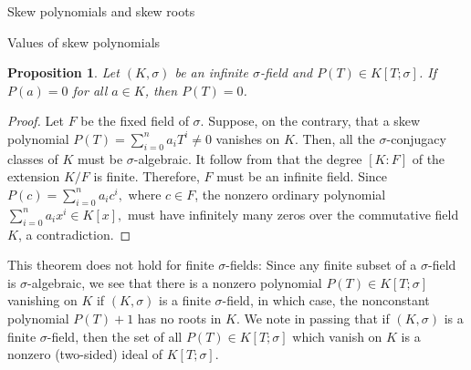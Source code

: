 \documentclass[11pt,a4paper]{article}
\theoremstyle{theorem}
\newtheorem{proposition}[theorem]{Proposition}
\numberwithin{equation}{section}
\newcommand{\s}{\sigma}
\begin{document}
\begin{section}{Skew polynomials and skew roots}
\begin{subsection}{Values of skew polynomials}
	\begin{proposition}
		Let $(K,\sigma)$ be an infinite $\s$-field and  $P(T)\in K[T;\sigma]$. If $P(a)=0$ for all $a\in K$, then $P(T)=0$. 
	\end{proposition}
	\begin{proof}
		Let $F$ be the fixed field of $\s$. Suppose, on the contrary, that a skew polynomial $P(T)=\sum_{i=0}^n a_i T^i\neq 0$ vanishes on $K$.  Then, all the $\s$-conjugacy classes of $K$ must be $\s$-algebraic. It follow from   \cite[Theorem 5.17]{lamleroy1988algebraic} that the degree $[K:F]$ of the extension $K/F$ is finite. Therefore, $F$ must be an infinite field. Since
		$P(c)=\sum_{i=0}^n a_i c^i,$
		where $c\in F$, the nonzero ordinary polynomial $\sum_{i=0}^n a_i x^i\in K[x],$ must have infinitely many zeros over the commutative field $K$, a contradiction.   	   
	\end{proof}
	This theorem does not hold for finite $\s$-fields:  Since any finite subset of a $\s$-field is $\s$-algebraic, we see that there is a nonzero polynomial $P(T)\in K[T;\sigma]$ vanishing on $K$ if $(K,\sigma)$ is a finite $\s$-field, in which case, the nonconstant polynomial $P(T)+1$ has no roots in $K$. We note in passing that if $(K,\s)$ is a finite $\s$-field, then the set of all $P(T)\in K[T;\sigma]$  which vanish on $K$ is a nonzero (two-sided) ideal of $ K[T;\sigma]$. 


\end{subsection}
\end{section}
\end{document}

